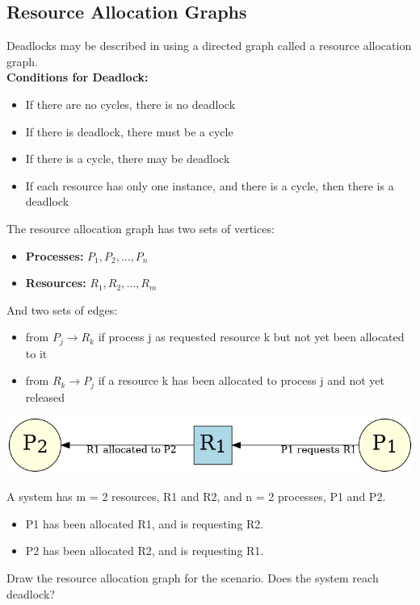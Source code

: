 \documentclass[a4paper, 10pt]{article}
\begin{document}
\subsection{Resource Allocation Graphs}
Deadlocks may be described in using a directed graph called a resource allocation graph. \\[2ex]
\textbf{Conditions for Deadlock:}
\begin{itemize}
    \item If there are no cycles, there is no deadlock
    \item If there is deadlock, there must be a cycle
    \item If there is a cycle, there may be deadlock
    \item If each resource has only one instance, and there is a cycle, then there is a  deadlock
\end{itemize}
The resource allocation graph has two sets of vertices:
\begin{itemize}
    \item \textbf{Processes:} $P_1, P_2, \dots, P_n$
    \item \textbf{Resources:} $R_1, R_2, \dots, R_m$
\end{itemize}
And two sets of edges:
\begin{itemize}
    \item from $P_j \to R_k$ if process j as requested resource k but not yet been allocated to it
    \item from $R_k \to P_j$ if a resource k has been allocated to process j and not yet released
\end{itemize}
\begin{center}
    \includegraphics[scale = 0.5]{images/resourceAllocationGraph.png}
\end{center}
\begin{examplebox}{}{}
    A system has m = 2 resources, R1 and R2, and n = 2 processes, P1 and P2.
    \begin{itemize}
        \item P1 has been allocated R1, and is requesting R2.
        \item P2 has been allocated R2, and is requesting R1.
    \end{itemize}
    Draw the resource allocation graph for the scenario. Does the system reach deadlock?
\end{examplebox}
\end{document}

